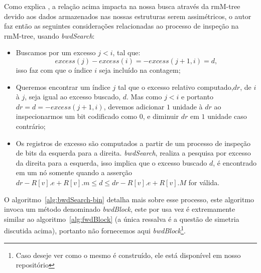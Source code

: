    Como explica \citeauthor{book-compact-data-structures}, a relação acima impacta na nossa busca através da rmM-tree devido aos dados
    armazenados nas nossas estruturas serem assimétricos, o autor faz então as seguintes considerações relacionadas ao processo de inspeção na rmM-tree,
    usando \textit{bwdSearch}:
    \begin{itemize}
        \item Buscamos por um excesso $j<i$, tal que:
         $$excess(j) - excess(i) = - excess(j+1,i) = d,$$ 
         isso faz com que o índice $i$ seja incluído na contagem;
        \item Queremos encontrar um índice $j$ tal que o excesso relativo computado,$dr$, de $i$ à $j$, seja igual ao excesso buscado, $d$.
         Mas como $j < i $ e portanto $dr = d = -excess(j+1,i)$,
        devemos adicionar $1$ unidade à $dr$ ao inspecionarmos um bit codificado como $0$, e diminuir $dr$ em $1$ unidade caso contrário;
        \item  Os registros de excesso são computados a partir de um processo de inspeção de bits da esquerda para a direita. \textit{bwdSearch}, realiza a pesquisa por excesso da direita para a esquerda, 
        isso implica que o excesso buscado $d$, é encontrado em um nó somente quando a asserção $dr - R[v].e + R[v].m \leq d \leq dr - R[v].e + R[v].M$ for válida.
    \end{itemize}
    O algoritmo~\ref*{alg:bwdSearch-bin} detalha mais sobre esse processo, este algoritmo invoca um método denominado \textit{bwdBlock}, este por usa vez é extremamente similar 
    ao algoritmo~\ref*{alg:fwdBlock} (a única ressalva é a questão de simetria discutida acima), portanto não fornecemos aqui \textit{bwdBlock}\footnote{Caso deseje ver como o mesmo é construído, ele 
    está disponível em nosso repositório}.
